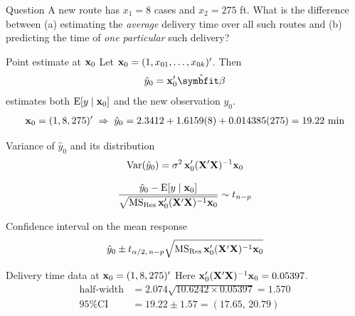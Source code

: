 \begin{frame}{Question}
    A new route has $x_1 = 8$ cases and $x_2 = 275$ ft. What is the difference between (a) estimating the \emph{average} delivery time over all such routes and (b) predicting the time of \emph{one particular} such delivery?
\end{frame}


\begin{frame}{Point estimate at $\mathbf{x}_0$}
    Let $\mathbf{x}_0 = (1, x_{01}, \dots, x_{0k})'$. Then
    \begin{align*}
        \hat y_0 = \bx_0'\hat{\bbeta}
    \end{align*}
    estimates both $\operatorname{E}[y \mid \mathbf{x}_0]$ and the new observation $y_0$.
    \begin{align*}
        \mathbf{x}_0 = (1, 8, 275)' \;\Rightarrow\; \hat y_0 = 2.3412 + 1.6159(8) + 0.014385(275) = 19.22 \text{ min}
    \end{align*}
\end{frame}


\begin{frame}{Variance of $\hat y_0$ and its distribution}
    \[
        \operatorname{Var}(\hat y_0) = \sigma^2\, \mathbf{x}_0'(\mathbf{X}'\mathbf{X})^{-1}\mathbf{x}_0
    \]

    \[
        \frac{\hat y_0 - \operatorname{E}[y \mid \mathbf{x}_0]}{\sqrt{\mathrm{MS}_{\mathrm{Res}}\, \mathbf{x}_0'(\mathbf{X}'\mathbf{X})^{-1}\mathbf{x}_0}} \sim t_{n-p}
    \]
\end{frame}


\begin{frame}{Confidence interval on the mean response}
    \begin{align*}
        \hat y_0 \pm t_{\alpha/2,\,n-p}\sqrt{\mathrm{MS}_{\mathrm{Res}}\, \mathbf{x}_0'(\mathbf{X}'\mathbf{X})^{-1}\mathbf{x}_0}
    \end{align*}
\end{frame}


\begin{frame}{Delivery time data at $\mathbf{x}_0 = (1, 8, 275)'$}
    Here $\mathbf{x}_0'(\mathbf{X}'\mathbf{X})^{-1}\mathbf{x}_0 = 0.05397$.
    \begin{align*}
        \text{half-width} &= 2.074\sqrt{10.6242 \times 0.05397} = 1.570 \\
        \text{95\% CI} &= 19.22 \pm 1.57 = (17.65,\, 20.79)
    \end{align*}
\end{frame}



